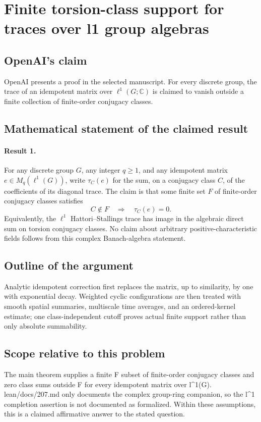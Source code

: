 \documentclass[11pt]{article}
\begin{document}
\section*{Finite torsion-class support for traces over l1 group algebras}

\subsection{OpenAI's claim}
OpenAI presents a proof in the selected manuscript. For every discrete group, the trace of an idempotent matrix over $\ell^1(G;\mathbb C)$ is claimed to vanish outside a finite collection of finite-order conjugacy classes.

\subsection{Mathematical statement of the claimed result}
\paragraph{Result 1.} For any discrete group \(G\), any integer \(q\ge1\), and any idempotent matrix \(e\in M_q(\ell^1(G))\), write \(\tau_C(e)\) for the sum, on a conjugacy class \(C\), of the coefficients of its diagonal trace. The claim is that some finite set \(F\) of finite-order conjugacy classes satisfies
\[
 C\notin F\quad\Longrightarrow\quad\tau_C(e)=0.
\]
Equivalently, the \(\ell^1\) Hattori--Stallings trace has image in the algebraic direct sum on torsion conjugacy classes. No claim about arbitrary positive-characteristic fields follows from this complex Banach-algebra statement.

\subsection{Outline of the argument}
Analytic idempotent correction first replaces the matrix, up to similarity, by one with exponential decay. Weighted cyclic configurations are then treated with smooth spatial summaries, multiscale time averages, and an ordered-kernel estimate; one class-independent cutoff proves actual finite support rather than only absolute summability.

\subsection{Scope relative to this problem}
The main theorem supplies a finite F subset of finite-order conjugacy classes and zero class sums outside F for every idempotent matrix over l\textasciicircum{}1(G). lean/docs/207.md only documents the complex group-ring companion, so the l\textasciicircum{}1 completion assertion is not documented as formalized. Within these assumptions, this is a claimed affirmative answer to the stated question.
\end{document}
